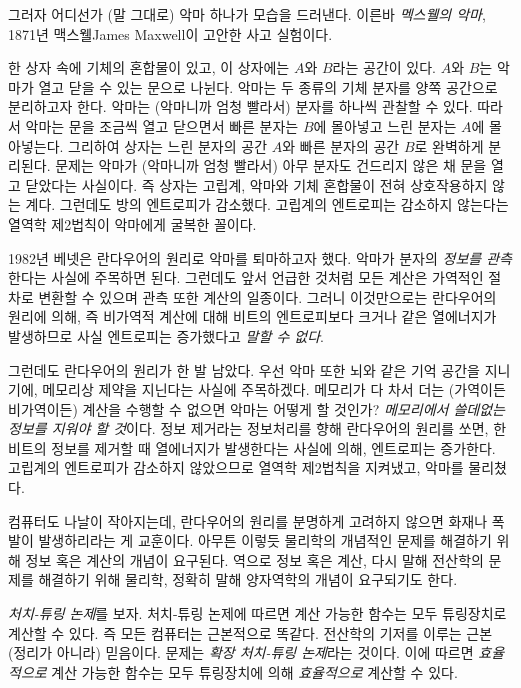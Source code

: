 \documentclass[a4paper,chapter,atbegshi]{oblivoir}
\begin{document}
그러자 어디선가 (말 그대로) 악마 하나가 모습을 드러낸다. 이른바 
\emph{멕스웰의 악마}, 1871년 맥스웰{\tiny James Maxwell}이 고안한 사고 실험이다. 

한 상자 속에 기체의 혼합물이 있고, 이 상자에는 $A$와 $B$라는 공간이 있다.
$A$와 $B$는 악마가 열고 닫을 수 있는 문으로 나뉜다. 악마는 두 종류의 기체 분자를
양쪽 공간으로 분리하고자 한다. 악마는 (악마니까 엄청 빨라서) 분자를 하나씩 관찰할
수 있다. 따라서 악마는 문을 조금씩 열고 닫으면서 빠른 분자는 $B$에 몰아넣고 느린
분자는 $A$에 몰아넣는다. 그리하여 상자는 느린 분자의 공간 $A$와 빠른 분자의 공간
$B$로 완벽하게 분리된다. 문제는 악마가 (악마니까 엄청 빨라서) 아무 분자도
건드리지 않은 채 문을 열고 닫았다는 사실이다. 즉 상자는 고립계, 악마와 기체
혼합물이 전혀 상호작용하지 않는 계다. 그런데도 방의 엔트로피가 감소했다.
고립계의 엔트로피는 감소하지 않는다는 열역학 제2법칙이 악마에게 굴복한 꼴이다. 

1982년 베넷은 란다우어의 원리로 악마를 퇴마하고자 했다. 악마가 분자의
\emph{정보를 관측}한다는 사실에 주목하면 된다. 그런데도 앞서 언급한 것처럼 모든
계산은 가역적인 절차로 변환할 수 있으며 관측 또한 계산의 일종이다. 그러니 
이것만으로는 란다우어의 원리에 의해, 즉 비가역적 계산에 대해 비트의 엔트로피보다
크거나 같은 열에너지가 발생하므로 사실 엔트로피는 증가했다고 \emph{말할 수 없다}.

그런데도 란다우어의 원리가 한 발 남았다. 우선 악마 또한 뇌와 같은 기억 공간을
지니기에, 메모리상 제약을 지닌다는 사실에 주목하겠다. 메모리가 다 차서
더는 (가역이든 비가역이든) 계산을 수행할 수 없으면 악마는 어떻게 할 것인가?
\emph{메모리에서 쓸데없는 정보를 지워야 할 것}이다. 정보 제거라는 정보처리를
향해 란다우어의 원리를 쏘면, 한 비트의 정보를 제거할 때 열에너지가 발생한다는
사실에 의해, 엔트로피는 증가한다. 고립계의 엔트로피가 감소하지 않았으므로
열역학 제2법칙을 지켜냈고, 악마를 물리쳤다. 

컴퓨터도 나날이 작아지는데, 란다우어의 원리를 분명하게 고려하지 않으면 화재나
폭발이 발생하리라는 게 교훈이다. 아무튼 이렇듯 물리학의 개념적인 문제를
해결하기 위해 정보 혹은 계산의 개념이 요구된다. 역으로 정보 혹은 계산, 다시 말해
전산학의 문제를 해결하기 위해 물리학, 정확히 말해 양자역학의 개념이 요구되기도
한다. 

\emph{처치-튜링 논제}를 보자. 처치-튜링 논제에 따르면 계산 가능한 함수는 모두
튜링장치로 계산할 수 있다. 즉 모든 컴퓨터는 근본적으로 똑같다. 전산학의
기저를 이루는 근본 (정리가 아니라) 믿음이다. 문제는 \emph{확장 처치-튜링 논제}라는
것이다. 이에 따르면 \emph{효율적으로} 계산 가능한 함수는 모두 튜링장치에 의해
\emph{효율적으로} 계산할 수 있다. 
\end{document}
